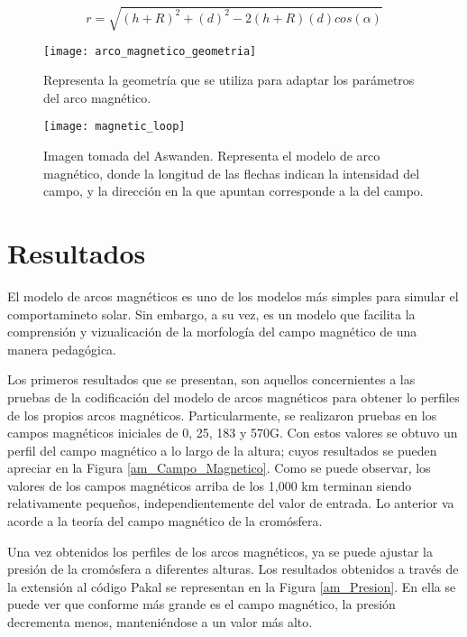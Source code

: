 \begin{equation*} \label{r_equation}
r = \sqrt{ (h+R)^2 + (d)^2 - 2(h+R)(d)cos(\alpha)  }
\end{equation*}

\begin{figure}[h]
\centering
\texttt{[image: arco\_magnetico\_geometria]}
\caption{ Representa la geometr\'ia que se utiliza para adaptar los par\'ametros del arco magn\'etico. }
\label{arco_geometria}
\end{figure}

\begin{figure}[h]
\centering
\texttt{[image: magnetic\_loop]}
\caption{ Imagen tomada del Aswanden. Representa el modelo de arco magn\'etico, donde la longitud de las flechas indican la intensidad del campo, y la direcci\'on en la que apuntan corresponde a la del campo. }
\label{arco_magnetico}
\end{figure}

\clearpage
\section{Resultados}

El modelo de arcos magn\'eticos es uno de los modelos m\'as simples para simular el comportamineto solar. Sin embargo, a su vez, es un modelo que facilita la comprensi\'on y vizualicaci\'on de la morfolog\'ia del campo magn\'etico de una manera pedag\'ogica.

Los primeros resultados que se presentan, son aquellos concernientes a las pruebas de la codificaci\'on del modelo de arcos magn\'eticos para obtener lo perfiles de los propios arcos magn\'eticos. Particularmente, se realizaron pruebas en los campos magn\'eticos iniciales de 0, 25, 183 y 570G. Con estos valores se obtuvo un perfil del campo magn\'etico a lo largo de la altura; cuyos resultados se pueden apreciar en la Figura \ref{am_Campo_Magnetico}. Como se puede observar, los valores de los campos magn\'eticos arriba de los 1,000 km terminan siendo relativamente peque\~nos, independientemente del valor de entrada. Lo anterior va acorde a la teor\'ia del campo magn\'etico de la crom\'osfera.

Una vez obtenidos los perfiles de los arcos magn\'eticos, ya se puede ajustar la presi\'on de la crom\'osfera a diferentes alturas. Los resultados obtenidos a trav\'es de la extensi\'on al c\'odigo Pakal se representan en la Figura \ref{am_Presion}. En ella se puede ver que conforme m\'as grande es el campo magn\'etico, la presi\'on decrementa menos, manteni\'endose a un valor m\'as alto. 

